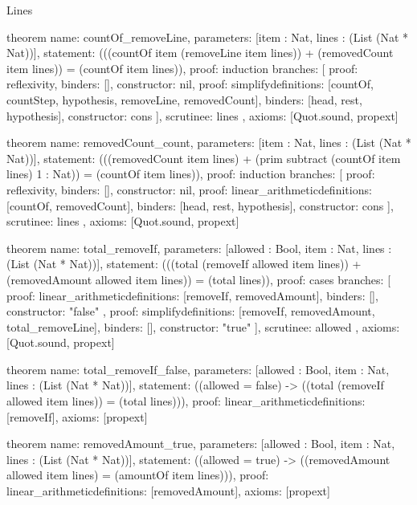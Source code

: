 \begin{lexlean}{Lines}
\begin{semanticmodule}
theorem{
  name: countOf_removeLine,
  parameters: [item : Nat, lines : (List (Nat * Nat))],
  statement: (((countOf item (removeLine item lines)) + (removedCount item lines)) = (countOf item lines)),
  proof: induction{
    branches: [
      {proof: reflexivity{}, binders: [], constructor: nil},
      {
        proof: simplify{definitions: [countOf, countStep, hypothesis, removeLine, removedCount]},
        binders: [head, rest, hypothesis],
        constructor: cons
      }
    ],
    scrutinee: lines
  },
  axioms: [Quot.sound, propext]
}

theorem{
  name: removedCount_count,
  parameters: [item : Nat, lines : (List (Nat * Nat))],
  statement: (((removedCount item lines) + (prim subtract (countOf item lines) 1 : Nat)) = (countOf item lines)),
  proof: induction{
    branches: [
      {proof: reflexivity{}, binders: [], constructor: nil},
      {
        proof: linear_arithmetic{definitions: [countOf, removedCount]},
        binders: [head, rest, hypothesis],
        constructor: cons
      }
    ],
    scrutinee: lines
  },
  axioms: [Quot.sound, propext]
}

theorem{
  name: total_removeIf,
  parameters: [allowed : Bool, item : Nat, lines : (List (Nat * Nat))],
  statement: (((total (removeIf allowed item lines)) + (removedAmount allowed item lines)) = (total lines)),
  proof: cases{
    branches: [
      {
        proof: linear_arithmetic{definitions: [removeIf, removedAmount]},
        binders: [],
        constructor: "false"
      },
      {
        proof: simplify{definitions: [removeIf, removedAmount, total_removeLine]},
        binders: [],
        constructor: "true"
      }
    ],
    scrutinee: allowed
  },
  axioms: [Quot.sound, propext]
}

theorem{
  name: total_removeIf_false,
  parameters: [allowed : Bool, item : Nat, lines : (List (Nat * Nat))],
  statement: ((allowed = false) -> ((total (removeIf allowed item lines)) = (total lines))),
  proof: linear_arithmetic{definitions: [removeIf]},
  axioms: [propext]
}

theorem{
  name: removedAmount_true,
  parameters: [allowed : Bool, item : Nat, lines : (List (Nat * Nat))],
  statement: ((allowed = true) -> ((removedAmount allowed item lines) = (amountOf item lines))),
  proof: linear_arithmetic{definitions: [removedAmount]},
  axioms: [propext]
}
\end{semanticmodule}
\end{lexlean}
